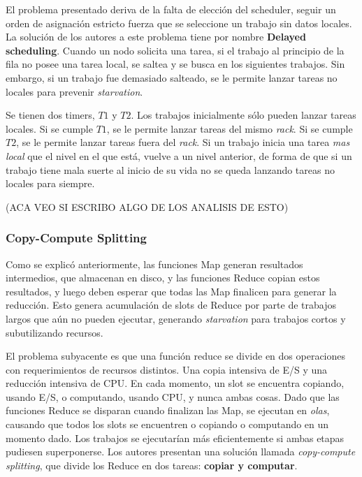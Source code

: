 \vspace{2mm}

El problema presentado deriva de la falta de elecci\'on del scheduler, seguir un orden de asignaci\'on estricto fuerza que se seleccione un trabajo sin datos locales. La soluci\'on de los autores a este problema tiene por nombre \textbf{Delayed scheduling}. Cuando un nodo solicita una tarea, si el trabajo al principio de la fila no posee una tarea local, se saltea y se busca en los siguientes trabajos. Sin embargo, si un trabajo fue demasiado salteado, se le permite lanzar tareas no locales para prevenir \emph{starvation}. 

\vspace{2mm}

Se tienen dos timers, $T1$ y $T2$. Los trabajos inicialmente s\'olo pueden lanzar tareas locales. Si se cumple $T1$, se le permite lanzar tareas del mismo \emph{rack}. Si se cumple $T2$, se le permite lanzar tareas fuera del \emph{rack}. Si un trabajo inicia una tarea \emph{mas local} que el nivel en el que est\'a, vuelve a un nivel anterior, de forma de que si un trabajo tiene mala suerte al inicio de su vida no se queda lanzando tareas no locales para siempre.

\vspace{2mm}

(ACA VEO SI ESCRIBO ALGO DE LOS ANALISIS DE ESTO)

\subsubsection{Copy-Compute Splitting}

Como se explic\'o anteriormente, las funciones Map generan resultados intermedios, que almacenan en disco, y las funciones Reduce copian estos resultados, y luego deben esperar que todas las Map finalicen para generar la reducci\'on. Esto genera acumulaci\'on de slots de Reduce por parte de trabajos largos que a\'un no pueden ejecutar, generando \emph{starvation} para trabajos cortos y subutilizando recursos.

\vspace{2mm} 

El problema subyacente es que una funci\'on reduce se divide en dos operaciones con requerimientos de recursos distintos. Una copia intensiva de E/S y una reducci\'on intensiva de CPU. En cada momento, un slot se encuentra copiando, usando E/S, o computando, usando CPU, y nunca ambas cosas. Dado que las funciones Reduce se disparan cuando finalizan las Map, se ejecutan en \emph{olas}, causando que todos los slots se encuentren o copiando o computando en un momento dado. Los trabajos se ejecutar\'ian m\'as eficientemente si ambas etapas pudiesen superponerse. Los autores presentan una soluci\'on llamada \emph{copy-compute splitting}, que divide los Reduce en dos tareas: \textbf{copiar y computar}.

